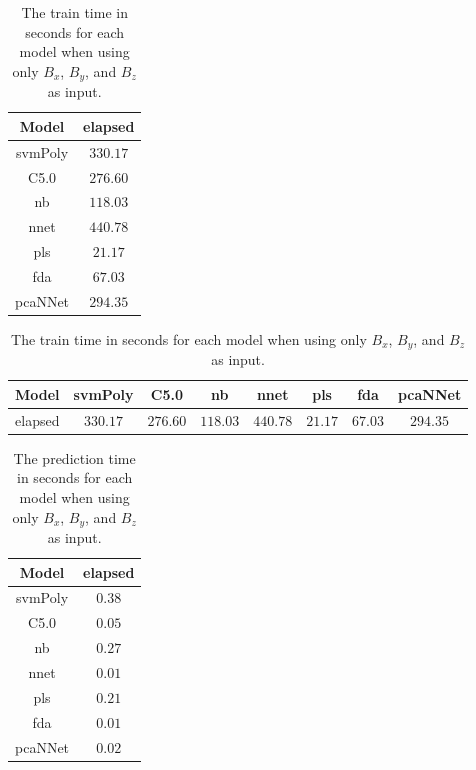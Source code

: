 \begin{table}[!ht]
	\centering
	\begin{tabular}{|c|c|}
		\hline
		Model & elapsed \\ \hline
		svmPoly & $330.17$ \\ \hline
		C5.0 & $276.60$ \\ \hline
		nb & $118.03$ \\ \hline
		nnet & $440.78$ \\ \hline
		pls & $21.17$ \\ \hline
		fda & $67.03$ \\ \hline
		pcaNNet & $294.35$ \\ \hline
	\end{tabular}
	\caption{The train time in seconds for each model when using only $B_{x}$, $B_{y}$, and $B_{z}$ as input.}
	\label{tab:time:coord:train}
\end{table}

\begin{table}[!ht]
	\centering
	\begin{tabular}{|c|c|c|c|c|c|c|c|}
		\hline
		Model & svmPoly & C5.0 & nb & nnet & pls & fda & pcaNNet \\ \hline
		elapsed & $330.17$ & $276.60$ & $118.03$ & $440.78$ & $21.17$ & $67.03$ & $294.35$ \\ \hline
	\end{tabular}
	\caption{The train time in seconds for each model when using only $B_{x}$, $B_{y}$, and $B_{z}$ as input.}
	\label{tab:time:reverse:coord:train}
\end{table}

\begin{table}[!ht]
	\centering
	\begin{tabular}{|c|c|}
		\hline
		Model & elapsed \\ \hline
		svmPoly & $0.38$ \\ \hline
		C5.0 & $0.05$ \\ \hline
		nb & $0.27$ \\ \hline
		nnet & $0.01$ \\ \hline
		pls & $0.21$ \\ \hline
		fda & $0.01$ \\ \hline
		pcaNNet & $0.02$ \\ \hline
	\end{tabular}
	\caption{The prediction time in seconds for each model when using only $B_{x}$, $B_{y}$, and $B_{z}$ as input.}
	\label{tab:time:coord:predict}
\end{table}

